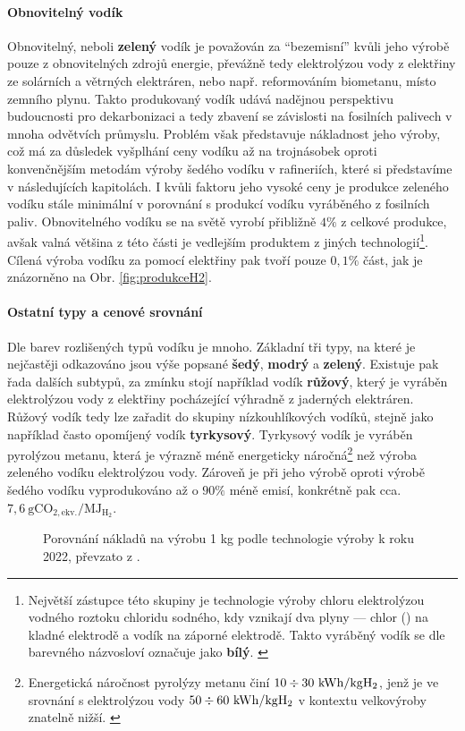\paragraph{Obnovitelný vodík}
Obnovitelný, neboli \textbf{zelený} vodík je považován za \enquote{bezemisní} kvůli jeho výrobě pouze z obnovitelných zdrojů energie, převážně tedy elektrolýzou vody z elektřiny ze solárních a větrných elektráren, nebo např. reformováním biometanu, místo zemního plynu. \cite{Griffiths2021} Takto produkovaný vodík udává nadějnou perspektivu budoucnosti pro dekarbonizaci a tedy zbavení se závislosti na fosilních palivech v mnoha odvětvích průmyslu. Problém však představuje nákladnost jeho výroby, což má za důsledek vyšplhání ceny vodíku až na trojnásobek oproti konvenčnějším metodám výroby šedého vodíku v rafineriích, které si představíme v následujících kapitolách. \cite{Hytep} I kvůli faktoru jeho vysoké ceny je produkce zeleného vodíku stále minimální v porovnání s produkcí vodíku vyráběného z fosilních paliv. Obnovitelného vodíku se na světě vyrobí přibližně $4\%$ z celkové produkce, avšak valná většina z této části je vedlejším produktem z jiných technologií\footnote{Největší zástupce této skupiny je technologie výroby chloru elektrolýzou vodného roztoku chloridu sodného, kdy vznikají dva plyny — chlor () na kladné elektrodě a vodík na záporné elektrodě. Takto vyráběný vodík se dle barevného názvosloví označuje jako \textbf{bílý}. \cite{Hytep}}. \cite{Hytep} Cílená výroba vodíku za pomocí elektřiny pak tvoří pouze $0,1\%$ část, jak je znázorněno na Obr. \ref{fig:produkceH2}.

\paragraph{Ostatní typy a cenové srovnání}

Dle barev rozlišených typů vodíku je mnoho. Základní tři typy, na které je nejčastěji odkazováno jsou výše popsané \textbf{šedý}, \textbf{modrý} a \textbf{zelený}. Existuje pak řada dalších subtypů, za zmínku stojí například vodík \textbf{růžový}, který je vyráběn elektrolýzou vody z elektřiny pocházející výhradně z jaderných elektráren. Růžový vodík tedy lze zařadit do skupiny nízkouhlíkových vodíků, stejně jako například často opomíjený vodík \textbf{tyrkysový}. Tyrkysový vodík je vyráběn pyrolýzou metanu, která je výrazně méně energeticky náročná\footnote{Energetická náročnost pyrolýzy metanu činí $10 \div 30\ \unit{\kWh}/\unit{\kg}{\ce{H_2}}$, jenž je ve srovnání s elektrolýzou vody $50 \div 60\ \unit{\kWh}/\unit{\kg}{\ce{H_2}}$ v kontextu velkovýroby znatelně nižší. \cite{Diab2022}} než výroba zeleného vodíku elektrolýzou vody. Zároveň je při jeho výrobě oproti výrobě šedého vodíku vyprodukováno až o $90\%$ méně emisí, konkrétně pak cca. $7,6\ \mathrm{gCO_{2,ekv.}}/\mathrm{MJ_{H_2}}$. \cite{Diab2022}
\begin{figure}[h]
    \centering
    
    \caption[Porovnání nákladů na výrobu 1 kg  podle technologie výroby k roku 2022]{Porovnání nákladů na výrobu 1 kg  podle technologie výroby k roku 2022, převzato z \cite{IEAreview}.}
    \label{fig:cenyH2}
\end{figure}


